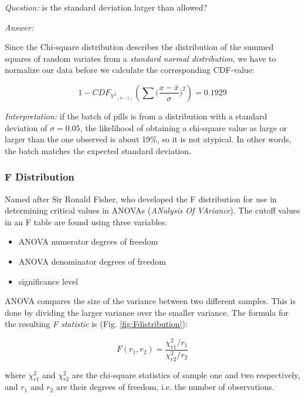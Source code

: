 \emph{Question:} is the standard deviation larger than allowed?

\emph{Answer:}

Since the Chi-square distribution describes the distribution of the summed squares of random variates from a \emph{standard normal distribution}, we have to normalize our data before we calculate the corresponding CDF-value:

\begin{equation}
  1 - CD{F_{{\chi ^2}_{(n - 1)}}}\left( {\sum {(\frac{{x - \bar x}}{\sigma }} {)^2}} \right) = 0.1929
\end{equation}

\emph{Interpretation:} if the batch of pills is from a distribution with a standard deviation of $\sigma=0.05$, the likelihood of obtaining a chi-square value as large or larger than the one observed is about 19\%, so it is not atypical. In other words, the batch matches the expected standard deviation.

\subsubsection{F Distribution}
Named after Sir Ronald Fisher, who developed the F distribution for use in determining critical values in ANOVAs (\emph{ANalysis Of VAriance}).  The cutoff values in an F table are found using three variables:

\begin{itemize}
  \item ANOVA numerator degrees of freedom
  \item ANOVA denominator degrees of freedom
  \item significance level
\end{itemize}

ANOVA compares the size of the variance between two different samples. This is done by dividing the larger variance over the smaller variance. The formula for the resulting \emph{F statistic} is (Fig. \ref{fig:Fdistribution}):

\begin{equation}
    F(r_1, r_2) = \frac{\chi_{r1} ^2 /r_1}{\chi_{r2} ^2 /r_2}
\end{equation}

where $\chi_{r1}^2$ and $\chi_{r2}^2$ are the chi-square statistics of sample one and two respectively, and $r_1$ and $r_2$ are their degrees of freedom, i.e. the number of observations.

